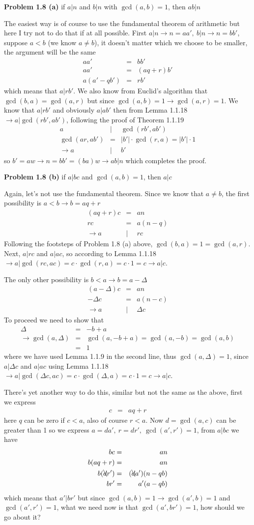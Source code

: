 \documentclass[aps,preprint,preprintnumbers,nofootinbib,showpacs,prd]{revtex4-1}
\newcommand{\nbea}{\begin{eqnarray*}}
\newcommand{\neea}{\end{eqnarray*}}
\begin{document}
{\bf Problem 1.8 (a)} if $a|n$ and $b|n$ with $\gcd(a,b)=1$, then $ab|n$

The easiest way is of course to use the fundamental theorem of arithmetic but here I try not to do that if at all possible. First $a|n \to n = aa',~b|n \to n = bb'$, suppose $a < b$ (we know $a \neq b$), it doesn't matter which we choose to be smaller, the argument will be the same
%
\nbea
aa' & = & bb' \\
aa' & = & (aq + r) b' \\
a (a' - qb') & = & rb'
\neea
%
which means that $a | rb'$. We also know from Euclid's algorithm that $\gcd(b,a) = \gcd(a, r)$ but since $\gcd(a,b) = 1 \to \gcd(a,r)=1$. We know that $a|rb'$ and obviously $a|ab'$ then from Lemma 1.1.18 $\to a|\gcd(rb',ab')$, following the proof of Theorem 1.1.19
%
\nbea
a & | & \gcd(rb',ab') \\
\gcd(ar,ab') & = & |b'| \cdot \gcd(r,a) = |b'| \cdot 1 \\
\to a & | & b'
\neea
%
so $b' = a w \to n = bb' = (b a) w \to ab | n$ which completes the proof.

{\bf Problem 1.8 (b)} if $a|bc$ and $\gcd(a,b) = 1$, then $a|c$

Again, let's not use the fundamental theorem. Since we know that $a \neq b$, the first possibility is $a < b \to b = aq + r$
%
\nbea
(aq+r)c & = & an \\
rc & = & a(n-q) \\
\to a & | & rc
\neea
%
Following the footsteps of Problem 1.8 (a) above, $\gcd(b,a) = 1 = \gcd(a,r)$. Next, $a|rc$ and $a|ac$, so according to Lemma 1.1.18 $\to a|\gcd(rc,ac) = c \cdot \gcd(r,a) = c \cdot 1 = c \to a | c$.

The only other possibility is $b < a \to b = a - \Delta$
%
\nbea
(a - \Delta)c & = & an \\
-\Delta c & = & a(n-c) \\
\to a & | & \Delta c
\neea
%
To proceed we need to show that
%
\nbea
\Delta & = & - b + a\\
\to \gcd(a,\Delta) & = & \gcd(a, - b + a) = \gcd(a,-b) = \gcd(a,b)\\
& = & 1
\neea
%
where we have used Lemma 1.1.9 in the second line, thus $\gcd(a,\Delta) = 1$, since $a|\Delta c$ and $a|ac$ using Lemma 1.1.18 $\to a|\gcd(\Delta c,ac) = c \cdot \gcd(\Delta,a) = c \cdot 1 = c \to a|c$.

There's yet another way to do this, similar but not the same as the above, first we express
%
\nbea
c & = & aq + r
\neea
%
here $q$ can be zero if $c < a$, also of course $r < a$. Now $d = \gcd(a,c)$ can be greater than 1 so we express $a = da',~r = dr',~\gcd(a',r')=1$, from $a|bc$ we have
%
\nbea
bc & = & an \\
b (aq + r) & = & an \\
b(\bcancel{d}r') & = & (\bcancel{d}a')(n - qb) \\
br' & = & a'(a - qb)
\neea
%
which means that $a'|br'$ but since $\gcd(a,b) = 1 \to \gcd(a',b) = 1$ and $\gcd(a',r') = 1$, what we need now is that $\gcd(a',br') = 1$, how should we go about it?
\end{document}
